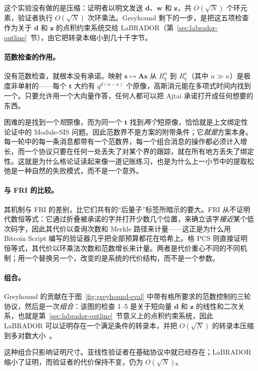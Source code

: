 这个实验没有做的是压缩：证明者以明文发送 $\mathbf{d}$、$\mathbf{w}$ 和 $\mathbf{z}$，共 $O(\sqrt{N})$ 个环元素，验证者执行 $O(\sqrt{N})$ 次环乘法。Greyhound 剩下的一步，是把这五项检查作为关于 $\mathbf{d}$ 和 $\mathbf{z}$ 的点积约束系统交给 LaBRADOR（第~\ref{sec:labrador-outline}~节），由它把转录本缩小到几十千字节。

\paragraph{范数检查的作用。}
没有范数检查，就根本没有承诺。映射 $\mathbf{s}\mapsto\mathbf{A}\mathbf{s}$ 从 $R_q^{n}$ 到 $R_q^{\kappa}$（其中 $n\gg\kappa$）是极度非单射的——每个 $\mathbf{t}$ 大约有 $q^{d(n-\kappa)}$ 个原像，高斯消元能在多项式时间内找到一个。只要允许用一个大向量作答，任何人都可以把 Ajtai 承诺打开成任何想要的东西。

困难的是找到一个\emph{短}原像，而为同一个 $\mathbf{t}$ 找到\emph{两个}短原像，恰恰就是上文绑定性论证中的 Module-SIS 问题。因此范数界不是方案的附带条件；它\emph{就是}方案本身。每一轮中的每一条消息都带有一个范数界，每一个组合消息的操作都必须计入增长，而一个协议只要在任何一处丢失了对某个界的跟踪，就在所有地方丢失了绑定性。这就是为什么格论证读起来像一道记账练习，也是为什么上一小节中的提取松弛是一种自然的失败模式，而不是一个意外。

\paragraph{与 FRI 的比较。}
其机制与 FRI 的差别，比它们共有的“后量子”标签所暗示的要大。FRI 从不证明代数恒等式：它通过折叠被承诺的字并打开少数几个位置，来确立该字\emph{接近}某个低次码字，因此其代价以查询次数和 Merkle 路径来计量——这正是为什么用 Bitcoin Script 编写的验证器几乎把全部预算都花在哈希上。格 PCS 则直接证明恒等式，其代价以环乘法次数和范数增长来计量。两者是代价重心不同的不同机制；用一个替换另一个，改变的是系统的代价结构，而不是一个参数。

\paragraph{组合。}
Greyhound 的贡献在于图~\ref{fig:greyhound-eval} 中带有格所要求的范数控制的三轮协议，然后是一次\emph{组合}：该图的检查 1--5 是关于短向量 $\mathbf{d}$ 和 $\mathbf{z}$ 的线性和二次关系，也就是第~\ref{sec:labrador-outline}~节意义上的点积约束系统，因此 LaBRADOR 可以证明存在一个满足条件的转录本，并把 $O(\sqrt{N})$ 的转录本压缩到多对数大小~\cite{greyhound2024}。

这种组合只影响证明尺寸。亚线性验证者在基础协议中就已经存在；LaBRADOR 缩小了证明，而验证者的代价保持不变，仍为 $O(\sqrt{N})$。

